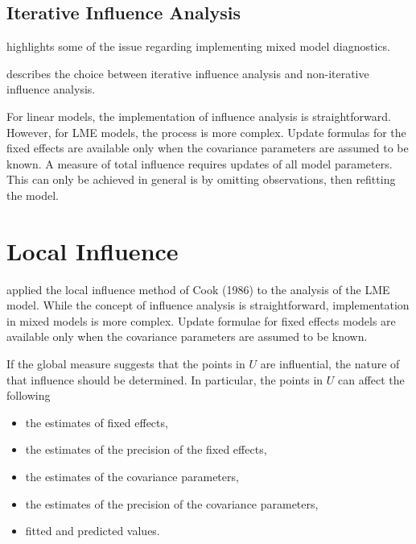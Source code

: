 \documentclass[12pt, a4paper]{report}
\theoremstyle{plain}
\theoremstyle{definition}
\theoremstyle{remark}
\begin{document}
\subsection{Iterative Influence Analysis}

\citet{schabenberger} highlights some of the issue regarding implementing mixed model diagnostics.

\citet{schabenberger} describes the choice between  iterative influence analysis and  non-iterative influence analysis.



For linear models, the implementation of influence analysis is straightforward.
However, for LME models, the process is more complex. Update formulas for the fixed effects are available only when the covariance parameters are assumed to be known. A measure of total influence requires updates of all model parameters.
This can only be achieved in general is by omitting observations, then refitting the model.


%
%
%



\section{Local Influence}
\citet{Beckman} applied the local influence method of Cook (1986) to the analysis of the LME model.
While the concept of influence analysis is straightforward, implementation in mixed models is more complex. Update formulae for fixed effects models are available only when the covariance parameters are assumed to be known.

If the global measure suggests that the points in $U$ are influential, the nature of that influence should be determined. In particular, the points in $U$ can affect the following

\begin{itemize}
	\item the estimates of fixed effects,
	\item the estimates of the precision of the fixed effects,
	\item the estimates of the covariance parameters,
	\item the estimates of the precision of the covariance parameters,
	\item fitted and predicted values.
\end{itemize}
\end{document}
